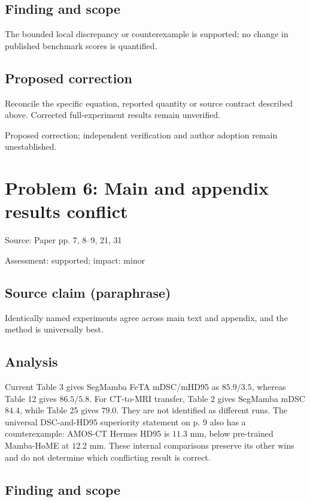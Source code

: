 \documentclass[11pt]{article}
\begin{document}
\subsection*{Finding and scope}

The bounded local discrepancy or counterexample is supported; no change in published benchmark scores is quantified.

\subsection*{Proposed correction}

Reconcile the specific equation, reported quantity or source contract described above. Corrected full-experiment results remain unverified.

Proposed correction; independent verification and author adoption remain unestablished.

\section*{Problem 6: Main and appendix results conflict}

Source: Paper pp. 7, 8–9, 21, 31

Assessment: supported; impact: minor

\subsection*{Source claim (paraphrase)}

Identically named experiments agree across main text and appendix, and the method is universally best.

\subsection*{Analysis}

Current Table 3 gives SegMamba FeTA mDSC/mHD95 as \(85.9/3.5\), whereas Table 12 gives \(86.5/5.8\). For CT-to-MRI transfer, Table 2 gives SegMamba mDSC \(84.4\), while Table 25 gives \(79.0\). They are not identified as different runs. The universal DSC-and-HD95 superiority statement on p. 9 also has a counterexample: AMOS-CT Hermes HD95 is \(11.3\) mm, below pre-trained Mamba-HoME at \(12.2\) mm. These internal comparisons preserve its other wins and do not determine which conflicting result is correct.

\subsection*{Finding and scope}
\end{document}
